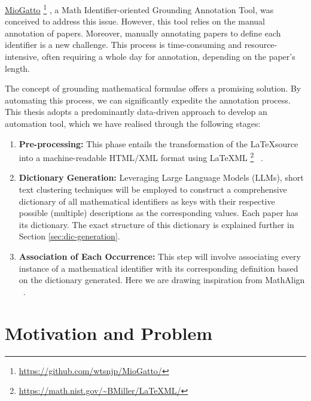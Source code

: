 
\href{https://github.com/wtsnjp/MioGatto/tree/main}{MioGatto} \footnote{\url{https://github.com/wtsnjp/MioGatto/}} \citep{asakura2021miogatto}, a Math Identifier-oriented Grounding Annotation Tool, was conceived to address this issue. However, this tool relies on the manual annotation of papers. Moreover, manually annotating papers to define each identifier is a new challenge. This process is time-consuming and resource-intensive, often requiring a whole day for annotation, depending on the paper's length.

The concept of grounding mathematical formulae \citep{asakura2020towards} offers a promising solution. By automating this process, we can significantly expedite the annotation process. This thesis adopts a predominantly data-driven approach to develop an automation tool, which we have realised through the following stages:

\begin{enumerate}
    \item \textbf{Pre-processing:} This phase entails the transformation of the \LaTeX \space source into a machine-readable HTML/XML format using \LaTeX ML \footnote{\url{https://math.nist.gov/~BMiller/LaTeXML/}} ~\citep{ginev2011latexml}.
    
    \item \textbf{Dictionary Generation:} Leveraging Large Language Models (\ac{LLMs}), short text clustering techniques will be employed to construct a comprehensive dictionary of all mathematical identifiers as keys with their respective possible (multiple) descriptions as the corresponding values. Each paper has its dictionary. The exact structure of this dictionary is explained further in Section \ref{sec:dic-generation}.
    
    \item \textbf{Association of Each Occurrence:} This step will involve associating every instance of a mathematical identifier with its corresponding definition based on the dictionary generated. Here we are drawing inspiration from MathAlign ~\citep{alexeeva2020mathalign}.
\end{enumerate}


\section{Motivation and Problem}

